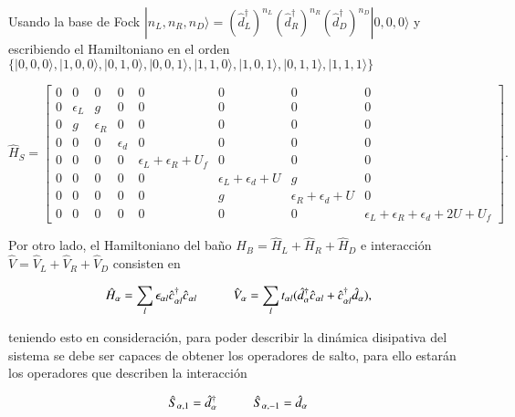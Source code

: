 Usando la base de Fock $|n_{L},n_{R},n_{D} \rangle = (\hat{d}^{\dagger}_{L})^{n_{L}}(\hat{d}^{\dagger}_{R})^{n_{R}}(\hat{d}^{\dagger}_{D})^{n_{D}}|0,0,0\rangle$ y escribiendo el Hamiltoniano en el orden 
$\{|0,0,0\rangle, |1,0,0\rangle, |0,1,0\rangle, |0,0,1\rangle, |1,1,0\rangle, |1,0,1\rangle, |0,1,1\rangle, |1,1,1\rangle\}$ 

\begin{equation*}
    \hat{H}_{S} = 
    \begin{bmatrix}
        0 & 0 & 0 & 0 & 0 & 0 & 0 & 0 \\
        0 & \epsilon_{L} & g & 0 & 0 & 0 & 0 & 0 \\
        0 & g & \epsilon_{R} & 0 & 0 & 0 & 0 & 0 \\
        0 & 0 & 0 & \epsilon_{d} & 0 & 0 & 0 & 0 \\
        0 & 0 & 0 & 0 & \epsilon_{L} + \epsilon_{R}  + U_{f} & 0 & 0 & 0 \\
        0 & 0 & 0 & 0 & 0 & \epsilon_{L} + \epsilon_{d} + U & g & 0 \\
        0 & 0 & 0 & 0 & 0 & g & \epsilon_{R} + \epsilon_{d} + U & 0 \\
        0 & 0 & 0 & 0 & 0 & 0 & 0 & \epsilon_{L} + \epsilon_{R}  + \epsilon_{d} + 2U + U_{f} 
        \end{bmatrix}.
\end{equation*}

Por otro lado, el Hamiltoniano del baño $\hat{H}_{B} = \hat{H}_{L} + \hat{H}_{R} + \hat{H}_{D}$ e interacción $\hat{V} = \hat{V}_{L} + \hat{V}_{R} + \hat{V}_{D}$ consisten en

\begin{equation*}
    \hat{H}_{\alpha} = \sum_{l} \epsilon_{\alpha l} \hat{c}^{\dagger}_{\alpha l}\hat{c}_{\alpha l} \hspace{10mm} \hat{V}_{\alpha} = \sum_{l} t_{\alpha l} ( \hat{d}^{\dagger}_{\alpha} \hat{c}_{\alpha l} + \hat{c}^{\dagger}_{\alpha l} \hat{d}_{\alpha} ),
\end{equation*}

teniendo esto en consideración, para poder describir la dinámica disipativa del sistema se debe ser capaces de obtener los operadores de salto, para ello estarán los operadores que describen la interacción

\begin{equation*}
    \hat{S}_{\alpha,1} = \hat{d}^{\dagger}_{\alpha} \hspace{10mm} \hat{S}_{\alpha,-1} = \hat{d}_{\alpha}
\end{equation*}

